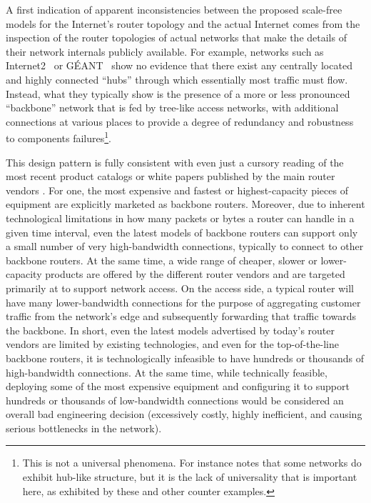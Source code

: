 A first indication of apparent inconsistencies between the proposed
scale-free models for the Internet's router topology and the actual
Internet comes from the inspection of the router topologies of actual
networks that make the details of their network internals publicly
available. For example, networks such as Internet2~\cite{internet2} or
G\'{E}ANT~\cite{geant} show no evidence that there exist any centrally
located and highly connected ``hubs'' through which essentially most
traffic must flow.  Instead, what they typically show is the presence
of a more or less pronounced ``backbone'' network that is fed by
tree-like access networks, with additional connections at various
places to provide a degree of redundancy and robustness to components
failures\footnote{This is not a universal phenomena. For instance
  \cite{Zoo} notes that some networks do exhibit hub-like structure, but
  it is the lack of universality that is important here, as exhibited
  by these and other counter examples.}.

This design pattern is fully consistent with even just a cursory
reading of the most recent product catalogs or white papers published
by the main router vendors
\cite{cisco13:_build_cost_effec_scalab_core,cisco13:_converged,juniper13:_evolv_backb_networ_using_mpls_super}.
For one, the most expensive and fastest or highest-capacity pieces of
equipment are explicitly marketed as backbone routers. Moreover, due
to inherent technological limitations in how many packets or bytes a
router can handle in a given time interval, even the latest models of
backbone routers can support only a small number of very
high-bandwidth connections, typically to connect to other backbone
routers. At the same time, a wide range of cheaper, slower or
lower-capacity products are offered by the different router vendors
and are targeted primarily at to support network access.  On the
access side, a typical router will have many lower-bandwidth
connections for the purpose of aggregating customer traffic from the
network's edge and subsequently forwarding that traffic towards the
backbone. In short, even the latest models advertised by today's
router vendors are limited by existing technologies, and even for the
top-of-the-line backbone routers, it is technologically infeasible to
have hundreds or thousands of high-bandwidth connections. At the same
time, while technically feasible, deploying some of the most expensive
equipment and configuring it to support hundreds or thousands of
low-bandwidth connections would be considered an overall bad
engineering decision (\eg excessively costly, highly inefficient, and
causing serious bottlenecks in the network).
 
